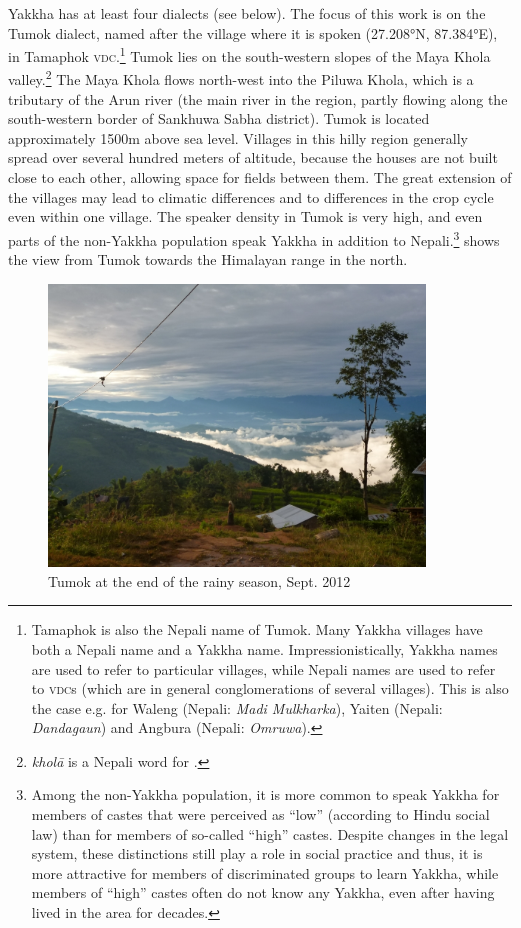Yakkha has at least four dialects (see  below). The focus of this work is on the Tumok dialect, named after the village where it is spoken (27.208°N, 87.384°E), in Tamaphok \textsc{vdc}.\footnote{Tamaphok is also the Nepali name of Tumok. Many Yakkha villages have both a Nepali name and a Yakkha name. Impressionistically, Yakkha names are used to refer to particular villages, while  Nepali names are used to refer  to \textsc{vdc}s (which are in general conglomerations of several villages). This is also the case e.g. for Waleng (Nepali: \emph{Madi Mulkharka}), Yaiten (Nepali: \emph{Dandagaun}) and Angbura (Nepali: \emph{Omruwa}).} Tumok  lies on the south-western slopes of the Maya Khola valley.\footnote{\emph{kholā} is a Nepali word for .} The Maya Khola flows north-west into the Piluwa Khola, which is a tributary of the Arun river (the main river in the region, partly flowing along the south-western border of Sankhuwa Sabha district). Tumok  is located approximately 1500m above sea level. Villages in this hilly region generally spread over several hundred meters of altitude, because the houses are not built close to each other, allowing space for fields between them. The great extension of the villages may lead to climatic differences and to differences in the crop cycle even within one village. The speaker density in Tumok is very high, and even parts of the non-Yakkha population speak Yakkha in addition to Nepali.\footnote{Among the non-Yakkha population, it is more common to speak Yakkha for members of castes that were perceived as “low” (according to Hindu social law)  than for members of so-called “high” castes. Despite changes in the legal system, these distinctions still play a role in social practice and thus, it is more attractive for members of discriminated groups to learn Yakkha, while members of “high” castes often do not know any Yakkha, even after having lived in the area for decades.}  shows the view from Tumok towards the Himalayan range in the north. 

\begin{figure}
\centering
\includegraphics[width=10cm]{figures/tamaphok.jpg}
\caption{Tumok at the end of the rainy season, Sept. 2012}\label{tumok}
\end{figure}
 

